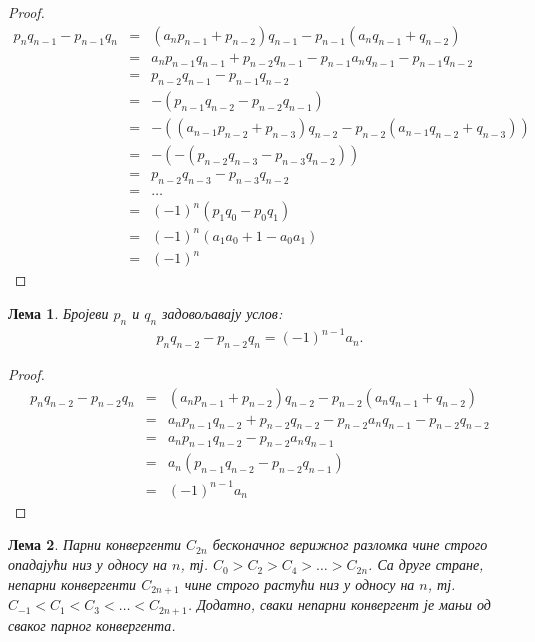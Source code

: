\documentclass[a4paper]{article}
\newtheorem{lemma}{Лема}
\begin{document}
\begin{proof}
	\begin{eqnarray*}
		p_{n}q_{n-1} - p_{n-1}q_{n} &=& (a_{n}p_{n-1} + p_{n-2})q_{n-1} - p_{n-1}(a_{n}q_{n-1} + q_{n-2})\\
									&=& a_{n}p_{n-1}q_{n-1} + p_{n-2}q_{n-1} - p_{n-1}a_{n}q_{n-1} - p_{n-1}q_{n-2}\\
									&=& p_{n-2}q_{n-1} - p_{n-1}q_{n-2}\\
									&=& -(p_{n-1}q_{n-2} - p_{n-2}q_{n-1})\\
									&=& -((a_{n-1}p_{n-2} + p_{n-3})q_{n-2} - p_{n-2}(a_{n-1}q_{n-2} + q_{n-3}))\\
									&=& -(-(p_{n-2}q_{n-3} - p_{n-3}q_{n-2}))\\
									&=& p_{n-2}q_{n-3} - p_{n-3}q_{n-2}\\
									&=& \ldots\\
									&=& (-1)^{n}(p_{1}q_{0} - p_{0}q_{1})\\
									&=& (-1)^{n}(a_{1}a_{0} + 1 - a_{0}a_{1})\\
									&=& (-1)^{n}
	\end{eqnarray*}
\end{proof}

\begin{lemma}
	\label{lemma:svojstva_p_q_2}
	Бројеви $ p_{n} $ и $ q_{n} $ задовољавају услов:
	\begin{eqnarray}
	\label{c.f_svojstvo_2} p_{n}q_{n-2} - p_{n-2}q_{n} = (-1)^{n-1}a_{n}.
	\end{eqnarray}	
\end{lemma}

\begin{proof}
	\begin{eqnarray*}
		p_{n}q_{n-2} - p_{n-2}q_{n} &=& (a_{n}p_{n-1} + p_{n-2})q_{n-2} - p_{n-2}(a_{n}q_{n-1} + q_{n-2})\\
		&=& a_{n}p_{n-1}q_{n-2} + p_{n-2}q_{n-2} - p_{n-2}a_{n}q_{n-1} - p_{n-2}q_{n-2}\\
		&=& a_{n}p_{n-1}q_{n-2} - p_{n-2}a_{n}q_{n-1}\\
		&=& a_{n}(p_{n-1}q_{n-2} - p_{n-2}q_{n-1})\\
		&=& (-1)^{n-1}a_{n}
	\end{eqnarray*}
\end{proof}

\begin{lemma}
	\label{lemma:svojstva_konvergenata}
	Парни конвергенти $ C_{2n} $ бесконачног верижног разломка чине строго опадајући низ у односу на $ n $, тј. $ C_{0} > C_{2} > C_{4} > \ldots > C_{2n} $. Са друге стране, непарни конвергенти $ C_{2n+1} $ чине строго растући низ у односу на $ n $, тј. $ C_{-1} < C_{1} < C_{3} < \ldots < C_{2n+1} $. Додатно, сваки непарни конвергент је мањи од сваког парног конвергента.
\end{lemma}
\end{document}
